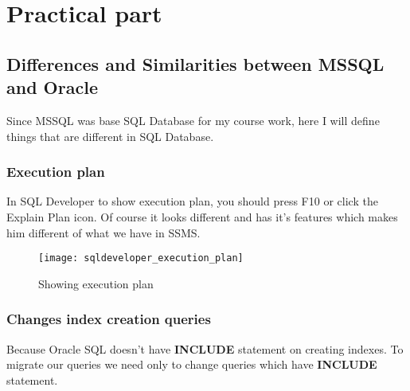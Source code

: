 \section{Practical part}

\subsection{Differences and Similarities between MSSQL and Oracle}
Since MSSQL was base SQL Database for my course work, here I will define things that are different in SQL Database.

\subsubsection{Execution plan}
In SQL Developer to show execution plan, you should press F10 or click the Explain Plan icon. Of course it looks different and has it's features which makes him different of what we have in SSMS.

\begin{figure}[ht!]
	\centering
	\texttt{[image: sqldeveloper\_execution\_plan]}
	\caption{Showing execution plan}
\end{figure}

\subsubsection{Changes index creation queries}
Because Oracle SQL doesn't have \textbf{INCLUDE} statement on creating indexes. To migrate our queries we need only to change queries which have \textbf{INCLUDE} statement.



\clearpage